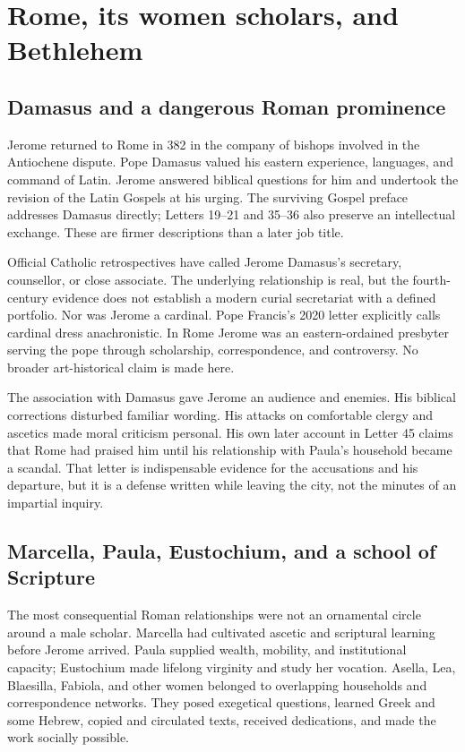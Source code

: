 \section{Rome, its women scholars, and Bethlehem}\label{sec:jerome-rome}

\subsection{Damasus and a dangerous Roman prominence}

Jerome returned to Rome in 382 in the company of bishops involved in the
Antiochene dispute. Pope Damasus valued his eastern experience, languages, and
command of Latin. Jerome answered biblical questions for him and undertook the
revision of the Latin Gospels at his urging. The surviving Gospel preface
addresses Damasus directly; Letters 19--21 and 35--36 also preserve an
intellectual exchange. These are firmer descriptions than a later job title.

Official Catholic retrospectives have called Jerome Damasus's secretary,
counsellor, or close associate. The underlying relationship is real, but the
fourth-century evidence does not establish a modern curial secretariat with a
defined portfolio. Nor was Jerome a cardinal. Pope Francis's 2020 letter
explicitly calls cardinal dress anachronistic. In Rome Jerome was an
eastern-ordained presbyter serving the pope through scholarship,
correspondence, and controversy. No broader art-historical claim is made here.

The association with Damasus gave Jerome an audience and enemies. His biblical
corrections disturbed familiar wording. His attacks on comfortable clergy and
ascetics made moral criticism personal. His own later account in Letter 45
claims that Rome had praised him until his relationship with Paula's household
became a scandal. That letter is indispensable evidence for the accusations and
his departure, but it is a defense written while leaving the city, not the
minutes of an impartial inquiry.

\subsection{Marcella, Paula, Eustochium, and a school of Scripture}

The most consequential Roman relationships were not an ornamental circle
around a male scholar. Marcella had cultivated ascetic and scriptural learning
before Jerome arrived. Paula supplied wealth, mobility, and institutional
capacity; Eustochium made lifelong virginity and study her vocation. Asella,
Lea, Blaesilla, Fabiola, and other women belonged to overlapping households
and correspondence networks. They posed exegetical questions, learned Greek
and some Hebrew, copied and circulated texts, received dedications, and made
the work socially possible.

